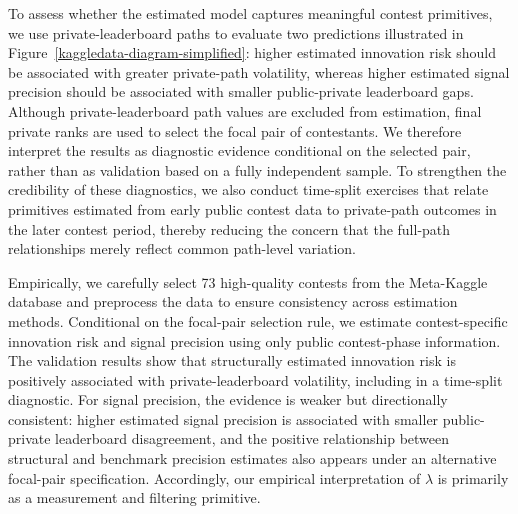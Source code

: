 \documentclass[mnsc]{informs3}
\begin{document}
To assess whether the estimated model captures meaningful contest primitives, we use private-leaderboard paths to evaluate two predictions illustrated in Figure~\ref{kaggledata-diagram-simplified}: 
higher estimated innovation risk should be associated with greater private-path volatility, 
whereas higher estimated signal precision should be associated with smaller public-private leaderboard gaps. 
Although private-leaderboard path values are excluded from estimation, final private ranks are used to select the focal pair of contestants. 
We therefore interpret the results as diagnostic evidence conditional on the selected pair, rather than as validation based on a fully independent sample. 
To strengthen the credibility of these diagnostics, we also conduct time-split exercises that relate primitives estimated from early public contest data to private-path outcomes in the later contest period, thereby reducing the concern that the full-path relationships merely reflect common path-level variation.


Empirically, we carefully select 73 high-quality contests from the Meta-Kaggle database and preprocess the data to ensure consistency across estimation methods.
Conditional on the focal-pair selection rule, we estimate contest-specific innovation risk and signal precision using only public contest-phase information.
The validation results show that structurally estimated innovation risk is positively associated with private-leaderboard volatility, including in a time-split diagnostic.
For signal precision, the evidence is weaker but directionally consistent: higher estimated signal precision is associated with smaller public-private leaderboard disagreement, and the positive relationship between structural and benchmark precision estimates also appears under an alternative focal-pair specification.
Accordingly, our empirical interpretation of $\lambda$ is primarily as a measurement and filtering primitive.
\end{document}
